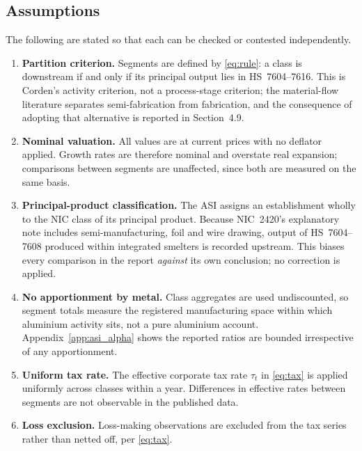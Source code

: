 \documentclass[11pt, a4paper]{article}
\numberwithin{figure}{section}
\numberwithin{table}{section}
\begin{document}
\subsection{Assumptions}
\label{app:asi_assumptions}

The following are stated so that each can be checked or contested independently.

\begin{enumerate}[label=\textbf{A\arabic*.}, leftmargin=2.6em]
    \item \textbf{Partition criterion.} Segments are defined by \eqref{eq:rule}: a
    class is downstream if and only if its principal output lies in HS~7604--7616.
    This is Corden's activity criterion, not a process-stage criterion; the
    material-flow literature separates semi-fabrication from fabrication, and the
    consequence of adopting that alternative is reported in Section~4.9.

    \item \textbf{Nominal valuation.} All values are at current prices with no
    deflator applied. Growth rates are therefore nominal and overstate real
    expansion; comparisons between segments are unaffected, since both are
    measured on the same basis.

    \item \textbf{Principal-product classification.} The ASI assigns an
    establishment wholly to the NIC class of its principal product. Because
    NIC~2420's explanatory note includes semi-manufacturing, foil and wire
    drawing, output of HS~7604--7608 produced within integrated smelters is
    recorded upstream. This biases every comparison in the report \emph{against}
    its own conclusion; no correction is applied.

    \item \textbf{No apportionment by metal.} Class aggregates are used
    undiscounted, so segment totals measure the registered manufacturing space
    within which aluminium activity sits, not a pure aluminium account.
    Appendix~\ref{app:asi_alpha} shows the reported ratios are bounded
    irrespective of any apportionment.

    \item \textbf{Uniform tax rate.} The effective corporate tax rate $\tau_t$ in
    \eqref{eq:tax} is applied uniformly across classes within a year. Differences
    in effective rates between segments are not observable in the published data.

    \item \textbf{Loss exclusion.} Loss-making observations are excluded from the
    tax series rather than netted off, per \eqref{eq:tax}.


\end{enumerate}
\end{document}
